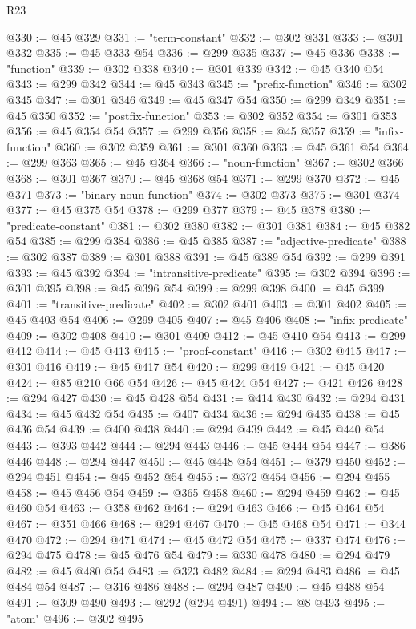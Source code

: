 \begin{lexlean}{R23}
\begin{coremodule}
@330 := @45 @329
@331 := "term-constant"
@332 := @302 @331
@333 := @301 @332
@335 := @45 @333 @54
@336 := @299 @335
@337 := @45 @336
@338 := "function"
@339 := @302 @338
@340 := @301 @339
@342 := @45 @340 @54
@343 := @299 @342
@344 := @45 @343
@345 := "prefix-function"
@346 := @302 @345
@347 := @301 @346
@349 := @45 @347 @54
@350 := @299 @349
@351 := @45 @350
@352 := "postfix-function"
@353 := @302 @352
@354 := @301 @353
@356 := @45 @354 @54
@357 := @299 @356
@358 := @45 @357
@359 := "infix-function"
@360 := @302 @359
@361 := @301 @360
@363 := @45 @361 @54
@364 := @299 @363
@365 := @45 @364
@366 := "noun-function"
@367 := @302 @366
@368 := @301 @367
@370 := @45 @368 @54
@371 := @299 @370
@372 := @45 @371
@373 := "binary-noun-function"
@374 := @302 @373
@375 := @301 @374
@377 := @45 @375 @54
@378 := @299 @377
@379 := @45 @378
@380 := "predicate-constant"
@381 := @302 @380
@382 := @301 @381
@384 := @45 @382 @54
@385 := @299 @384
@386 := @45 @385
@387 := "adjective-predicate"
@388 := @302 @387
@389 := @301 @388
@391 := @45 @389 @54
@392 := @299 @391
@393 := @45 @392
@394 := "intransitive-predicate"
@395 := @302 @394
@396 := @301 @395
@398 := @45 @396 @54
@399 := @299 @398
@400 := @45 @399
@401 := "transitive-predicate"
@402 := @302 @401
@403 := @301 @402
@405 := @45 @403 @54
@406 := @299 @405
@407 := @45 @406
@408 := "infix-predicate"
@409 := @302 @408
@410 := @301 @409
@412 := @45 @410 @54
@413 := @299 @412
@414 := @45 @413
@415 := "proof-constant"
@416 := @302 @415
@417 := @301 @416
@419 := @45 @417 @54
@420 := @299 @419
@421 := @45 @420
@424 := @85 @210 @66 @54
@426 := @45 @424 @54
@427 := @421 @426
@428 := @294 @427
@430 := @45 @428 @54
@431 := @414 @430
@432 := @294 @431
@434 := @45 @432 @54
@435 := @407 @434
@436 := @294 @435
@438 := @45 @436 @54
@439 := @400 @438
@440 := @294 @439
@442 := @45 @440 @54
@443 := @393 @442
@444 := @294 @443
@446 := @45 @444 @54
@447 := @386 @446
@448 := @294 @447
@450 := @45 @448 @54
@451 := @379 @450
@452 := @294 @451
@454 := @45 @452 @54
@455 := @372 @454
@456 := @294 @455
@458 := @45 @456 @54
@459 := @365 @458
@460 := @294 @459
@462 := @45 @460 @54
@463 := @358 @462
@464 := @294 @463
@466 := @45 @464 @54
@467 := @351 @466
@468 := @294 @467
@470 := @45 @468 @54
@471 := @344 @470
@472 := @294 @471
@474 := @45 @472 @54
@475 := @337 @474
@476 := @294 @475
@478 := @45 @476 @54
@479 := @330 @478
@480 := @294 @479
@482 := @45 @480 @54
@483 := @323 @482
@484 := @294 @483
@486 := @45 @484 @54
@487 := @316 @486
@488 := @294 @487
@490 := @45 @488 @54
@491 := @309 @490
@493 := @292 (@294 @491)
@494 := @8 @493
@495 := "atom"
@496 := @302 @495

\end{coremodule}
\end{lexlean}
